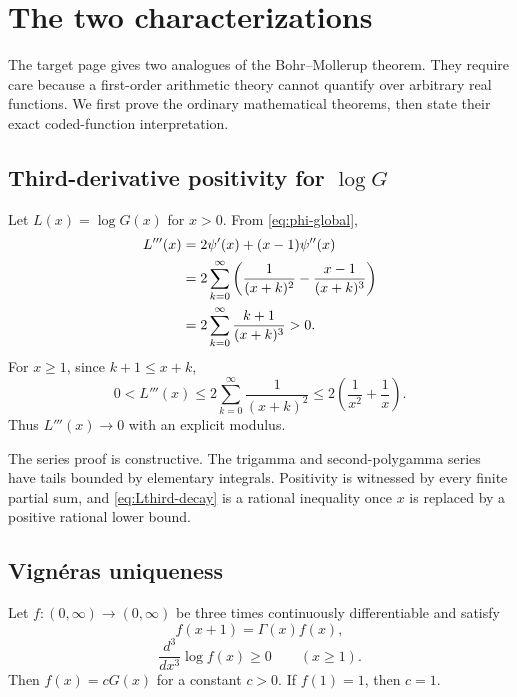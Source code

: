 \section{The two characterizations}\label{sec:characterization}

The target page gives two analogues of the Bohr--Mollerup theorem.  They require
care because a first-order arithmetic theory cannot quantify over arbitrary
real functions.  We first prove the ordinary mathematical theorems, then state
their exact coded-function interpretation.

\subsection{Third-derivative positivity for \texorpdfstring{$\log G$}{log G}}

Let \(L(x)=\log G(x)\) for \(x>0\).  From \cref{eq:phi-global},
\begin{align}
 L'''(x)&=2\psi'(x)+(x-1)\psi''(x)\notag\\
 &=2\sum_{k=0}^{\infty}
 \left(\frac1{(x+k)^2}-\frac{x-1}{(x+k)^3}\right)\notag\\
 &=2\sum_{k=0}^{\infty}\frac{k+1}{(x+k)^3}>0.
 \label{eq:Lthird}
\end{align}
For \(x\ge1\), since \(k+1\le x+k\),
\begin{equation}\label{eq:Lthird-decay}
 0<L'''(x)
 \le2\sum_{k=0}^{\infty}\frac1{(x+k)^2}
 \le2\left(\frac1{x^2}+\frac1x\right).
\end{equation}
Thus \(L'''(x)\to0\) with an explicit modulus.

The series proof is constructive.  The trigamma and second-polygamma series
have tails bounded by elementary integrals.  Positivity is witnessed by every
finite partial sum, and \cref{eq:Lthird-decay} is a rational inequality once
\(x\) is replaced by a positive rational lower bound.

\subsection{Vign\'eras uniqueness}

\begin{theorem}\label{thm:vigneras}
Let \(f:(0,\infty)\to(0,\infty)\) be three times continuously differentiable
and satisfy
\begin{equation}\label{eq:vigneras-rec}
 f(x+1)=\Gamma(x)f(x),
 \end{equation}
\begin{equation}\label{eq:vigneras-convex}
 \frac{d^3}{dx^3}\log f(x)\ge0\qquad(x\ge1).
\end{equation}
Then \(f(x)=cG(x)\) for a constant \(c>0\).  If \(f(1)=1\), then \(c=1\).
\end{theorem}

